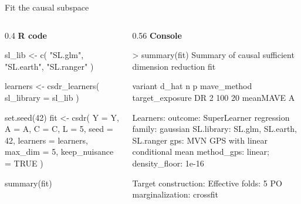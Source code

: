 \documentclass[
  ignorenonframetext,
  aspectratio=169,
  11pt]{beamer}
\newenvironment{Shaded}{\begin{snugshade}}{\end{snugshade}}
\newcommand{\AttributeTok}[1]{\textcolor[rgb]{0.40,0.45,0.13}{#1}}
\newcommand{\ConstantTok}[1]{\textcolor[rgb]{0.56,0.35,0.01}{#1}}
\newcommand{\DecValTok}[1]{\textcolor[rgb]{0.68,0.00,0.00}{#1}}
\newcommand{\FunctionTok}[1]{\textcolor[rgb]{0.28,0.35,0.67}{#1}}
\newcommand{\NormalTok}[1]{\textcolor[rgb]{0.00,0.23,0.31}{#1}}
\newcommand{\OtherTok}[1]{\textcolor[rgb]{0.00,0.23,0.31}{#1}}
\newcommand{\StringTok}[1]{\textcolor[rgb]{0.13,0.47,0.30}{#1}}
\newcommand{\workflowcodefont}{\fontsize{6.3}{7.1}\selectfont}
\newcommand{\method}[1]{%
  \textcolor{emoryblue}{\textbf{#1}}%
}
\begin{document}
\begin{frame}[fragile,t]{Fit the causal subspace}
\protect{}\label{fit-the-causal-subspace}
\begin{columns}[T]
\begin{column}{0.4\linewidth}
\method{R code}

\workflowcodefont

\begin{Shaded}
\begin{Highlighting}[]
\NormalTok{sl\_lib }\OtherTok{\textless{}{-}} \FunctionTok{c}\NormalTok{(}
  \StringTok{"SL.glm"}\NormalTok{, }\StringTok{"SL.earth"}\NormalTok{, }\StringTok{"SL.ranger"}
\NormalTok{)}

\NormalTok{learners }\OtherTok{\textless{}{-}} \FunctionTok{csdr\_learners}\NormalTok{(}
  \AttributeTok{sl\_library =}\NormalTok{ sl\_lib}
\NormalTok{)}

\FunctionTok{set.seed}\NormalTok{(}\DecValTok{42}\NormalTok{)}
\NormalTok{fit }\OtherTok{\textless{}{-}} \FunctionTok{csdr}\NormalTok{(}
  \AttributeTok{Y =}\NormalTok{ Y, }\AttributeTok{A =}\NormalTok{ A, }\AttributeTok{C =}\NormalTok{ C,}
  \AttributeTok{L =} \DecValTok{5}\NormalTok{, }\AttributeTok{seed =} \DecValTok{42}\NormalTok{,}
  \AttributeTok{learners =}\NormalTok{ learners,}
  \AttributeTok{max\_dim =} \DecValTok{5}\NormalTok{,}
  \AttributeTok{keep\_nuisance =} \ConstantTok{TRUE}
\NormalTok{)}

\FunctionTok{summary}\NormalTok{(fit)}
\end{Highlighting}
\end{Shaded}
\end{column}

\begin{column}{0.56\linewidth}
\method{Console}

\workflowcodefont

\begin{Shaded}
\begin{Highlighting}[]
\NormalTok{\textgreater{} summary(fit)}
\NormalTok{Summary of causal sufficient dimension reduction fit}

\NormalTok{ variant d\_hat  n p mave\_method target\_exposure}
\NormalTok{      DR     2 100 20   meanMAVE               A}

\NormalTok{Learners:}
\NormalTok{ outcome: SuperLearner regression}
\NormalTok{   family: gaussian}
\NormalTok{   SL.library: SL.glm, SL.earth, SL.ranger}
\NormalTok{ gps: MVN GPS with linear conditional mean}
\NormalTok{   method\_gps: linear; density\_floor: 1e{-}16}

\NormalTok{Target construction:}
\NormalTok{Effective folds: 5}
\NormalTok{PO marginalization: crossfit}
\end{Highlighting}
\end{Shaded}
\end{column}
\end{columns}
\end{frame}
\end{document}

